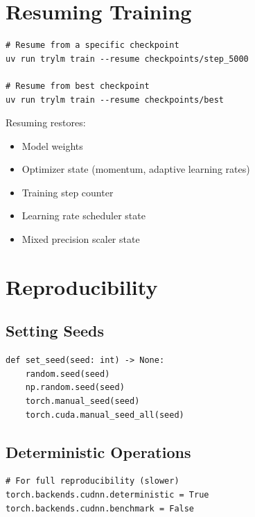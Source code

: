 \section{Resuming Training}

\begin{lstlisting}[style=shell]
# Resume from a specific checkpoint
uv run trylm train --resume checkpoints/step_5000

# Resume from best checkpoint
uv run trylm train --resume checkpoints/best
\end{lstlisting}

Resuming restores:
\begin{itemize}
    \item Model weights
    \item Optimizer state (momentum, adaptive learning rates)
    \item Training step counter
    \item Learning rate scheduler state
    \item Mixed precision scaler state
\end{itemize}

\section{Reproducibility}

\subsection{Setting Seeds}

\begin{lstlisting}[style=python]
def set_seed(seed: int) -> None:
    random.seed(seed)
    np.random.seed(seed)
    torch.manual_seed(seed)
    torch.cuda.manual_seed_all(seed)
\end{lstlisting}

\subsection{Deterministic Operations}

\begin{lstlisting}[style=python]
# For full reproducibility (slower)
torch.backends.cudnn.deterministic = True
torch.backends.cudnn.benchmark = False
\end{lstlisting}

